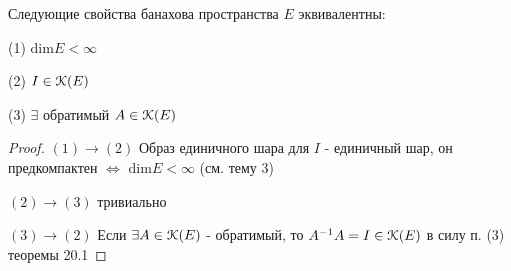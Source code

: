 \documentclass[a4paper,12pt]{report}
\begin{document}
 


\begin{cons}
Следующие свойства банахова пространства $E$ эквивалентны:

(1) $\mathrm{dim}E<\infty$

(2) $I\in\EuScript K(E)$

(3) $\exists$ обратимый $A\in\EuScript K(E)$
\end{cons}
\begin{proof}
$(1)\to(2)$ Образ единичного шара для $I$ - единичный шар, он предкомпактен $\Leftrightarrow$ $\mathrm{dim}E<\infty$ (см. тему 3)

$(2)\to(3)$ тривиально

$(3)\to(2)$ Если $\exists A\in\EuScript K(E)$ - обратимый, то $A^{-1}A=I\in\EuScript K(E)$ в силу п. (3) теоремы 20.1
\end{proof}
 
\end{document}
